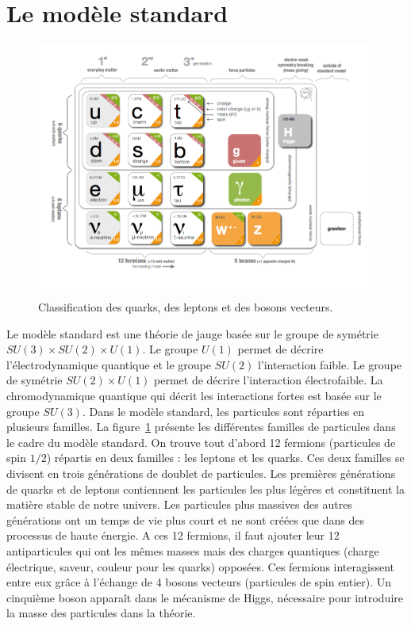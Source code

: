 \section{Le modèle standard}
\begin{figure}[!ht]
  \begin{center}
    \includegraphics[width=.7\textwidth]{ModelStandard/figs/Standard_model_infographic_bis.png}
    \caption{Classification des quarks, des leptons et des bosons vecteurs.}
    \label{fig:mc}
  \end{center}
\end{figure}
Le modèle standard est une théorie de jauge basée sur le groupe de symétrie $SU(3)\times SU(2)\times U(1)$. Le groupe $U(1)$ permet de décrire l'électrodynamique quantique et le groupe $SU(2)$ l'interaction faible. Le groupe de symétrie $SU(2)\times U(1)$ permet de décrire l’interaction électrofaible. La chromodynamique quantique qui décrit les interactions fortes est basée sur le groupe $SU(3)$. Dans le modèle standard, les particules sont réparties en plusieurs familles. La figure~\ref{fig:mc} présente les différentes familles de particules dans le cadre du modèle standard. On trouve tout d'abord 12 fermions (particules de spin $1/2$) répartis en deux familles : les leptons et les quarks. Ces deux familles se divisent en trois générations de doublet de particules. Les premières générations de quarks et de leptons contiennent les particules les plus légères et constituent la matière stable de notre univers. Les particules plus massives des autres générations ont un temps de vie plus court et ne sont créées que dans des processus de haute énergie. A ces 12 fermions, il faut ajouter leur 12 antiparticules qui ont les mêmes masses mais des charges quantiques (charge électrique, saveur, couleur pour les quarks) opposées. Ces fermions interagissent entre eux grâce à l'échange de 4 bosons vecteurs (particules de spin entier). Un cinquième boson apparaît dans le mécanisme de Higgs, nécessaire pour introduire la masse des particules dans la théorie. 
